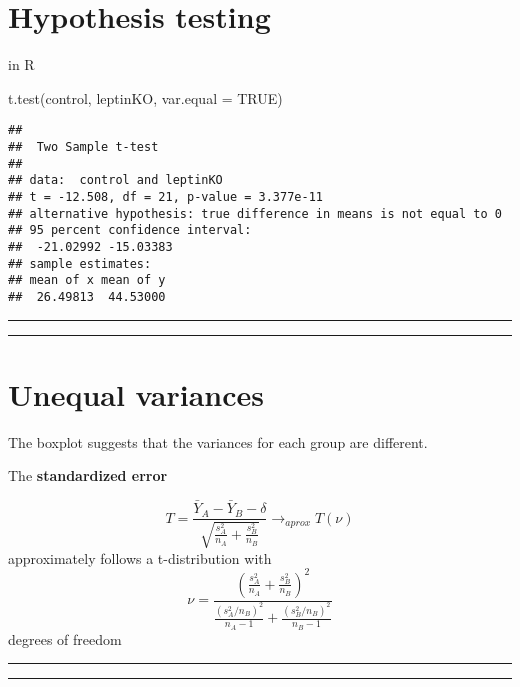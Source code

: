 \documentclass[
]{book}
\newenvironment{Shaded}{\begin{snugshade}}{\end{snugshade}}
\newcommand{\AttributeTok}[1]{\textcolor[rgb]{0.77,0.63,0.00}{#1}}
\newcommand{\ConstantTok}[1]{\textcolor[rgb]{0.00,0.00,0.00}{#1}}
\newcommand{\FunctionTok}[1]{\textcolor[rgb]{0.00,0.00,0.00}{#1}}
\newcommand{\NormalTok}[1]{#1}
\begin{document}
\hypertarget{hypothesis-testing-4}{%
\section{Hypothesis testing}\label{hypothesis-testing-4}}

in R

\begin{Shaded}
\begin{Highlighting}[]
\FunctionTok{t.test}\NormalTok{(control, leptinKO, }\AttributeTok{var.equal =} \ConstantTok{TRUE}\NormalTok{)}
\end{Highlighting}
\end{Shaded}

\begin{verbatim}
## 
##  Two Sample t-test
## 
## data:  control and leptinKO
## t = -12.508, df = 21, p-value = 3.377e-11
## alternative hypothesis: true difference in means is not equal to 0
## 95 percent confidence interval:
##  -21.02992 -15.03383
## sample estimates:
## mean of x mean of y 
##  26.49813  44.53000
\end{verbatim}

\begin{center}\rule{0.5\linewidth}{0.5pt}\end{center}

\begin{center}\rule{0.5\linewidth}{0.5pt}\end{center}

\hypertarget{unequal-variances}{%
\section{Unequal variances}\label{unequal-variances}}

The boxplot suggests that the variances for each group are different.

The \textbf{standardized error}

\[T=\frac{\bar{Y}_A-\bar{Y}_B -\delta}{\sqrt{\frac{s_A^2}{n_A}+\frac{s_B^2}{n_B}}} \rightarrow_{aprox} T(\nu)\]
approximately follows a t-distribution with
\[\nu=\frac{(\frac{s_A^2}{n_A}+\frac{s_B^2}{n_B})^2}{\frac{(s_A^2/n_B)^2}{n_A-1}+\frac{(s_B^2/n_B)^2}{n_B-1}}\]
degrees of freedom

\begin{center}\rule{0.5\linewidth}{0.5pt}\end{center}

\begin{center}\rule{0.5\linewidth}{0.5pt}\end{center}
\end{document}
